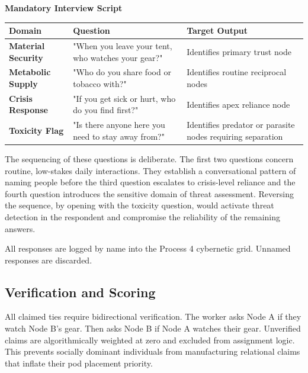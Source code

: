 \documentclass[12pt, letterpaper]{article}
\renewcommand{\arraystretch}{1.3}
\begin{document}
\textbf{Mandatory Interview Script}

\begin{table}[H]
\renewcommand{\arraystretch}{1.2}
\begin{tabularx}{\textwidth}{@{} >{\raggedright\arraybackslash}p{3.5cm} >{\raggedright\arraybackslash}X >{\raggedright\arraybackslash}p{5.5cm} @{}}
\toprule
\textbf{Domain} & \textbf{Question} & \textbf{Target Output} \\
\midrule
\textbf{Material Security} & "When you leave your tent, who watches your gear?" & Identifies primary trust node \\
\textbf{Metabolic Supply} & "Who do you share food or tobacco with?" & Identifies routine reciprocal nodes \\
\textbf{Crisis Response} & "If you get sick or hurt, who do you find first?" & Identifies apex reliance node \\
\textbf{Toxicity Flag} & "Is there anyone here you need to stay away from?" & Identifies predator or parasite nodes requiring separation \\
\bottomrule
\end{tabularx}
\end{table}

The sequencing of these questions is deliberate. The first two questions concern routine, low-stakes daily interactions. They establish a conversational pattern of naming people before the third question escalates to crisis-level reliance and the fourth question introduces the sensitive domain of threat assessment. Reversing the sequence, by opening with the toxicity question, would activate threat detection in the respondent and compromise the reliability of the remaining answers.

All responses are logged by name into the Process 4 cybernetic grid. Unnamed responses are discarded.

\subsection{Verification and Scoring}

All claimed ties require bidirectional verification. The worker asks Node A if they watch Node B's gear. Then asks Node B if Node A watches their gear. Unverified claims are algorithmically weighted at zero and excluded from assignment logic. This prevents socially dominant individuals from manufacturing relational claims that inflate their pod placement priority.
\end{document}
